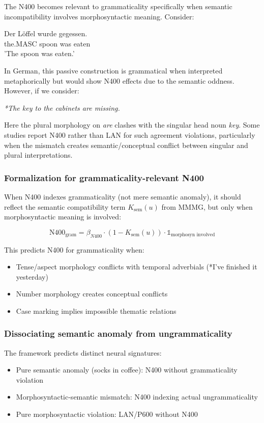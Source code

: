 \documentclass[12pt,letterpaper]{article}
\begin{document}
The N400 becomes relevant to grammaticality specifically when semantic incompatibility involves morphosyntactic meaning. Consider:

\ea\label{ex:N400-grammaticality}
\gll Der Löffel wurde gegessen.\\
the.MASC spoon was eaten\\
\glt 'The spoon was eaten.'
\z

In German, this passive construction is grammatical when interpreted metaphorically but would show N400 effects due to the semantic oddness. However, if we consider:

\ea\label{ex:N400-ungrammatical}
\textit{*The key to the cabinets are missing.}
\z

Here the plural morphology on \textit{are} clashes with the singular head noun \textit{key}. Some studies report N400 rather than LAN for such agreement violations, particularly when the mismatch creates semantic/conceptual conflict between singular and plural interpretations.

\subsubsection{Formalization for grammaticality-relevant N400}

When N400 indexes grammaticality (not mere semantic anomaly), it should reflect the semantic compatibility term $K_{\text{sem}}(u)$ from MMMG, but only when morphosyntactic meaning is involved:

\[
\text{N400}_{\text{gram}} = \beta_{N400} \cdot (1 - K_{\text{sem}}(u)) \cdot \mathbb{1}_{\text{morphosyn involved}}
\]

This predicts N400 for grammaticality when:
\begin{itemize}
    \item Tense/aspect morphology conflicts with temporal adverbials (*I've finished it yesterday)
    \item Number morphology creates conceptual conflicts
    \item Case marking implies impossible thematic relations
\end{itemize}

\subsubsection{Dissociating semantic anomaly from ungrammaticality}

The framework predicts distinct neural signatures:
\begin{itemize}
    \item Pure semantic anomaly (socks in coffee): N400 without grammaticality violation
    \item Morphosyntactic-semantic mismatch: N400 indexing actual ungrammaticality
    \item Pure morphosyntactic violation: LAN/P600 without N400
\end{itemize}
\end{document}
